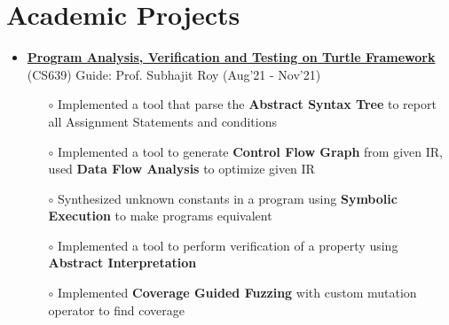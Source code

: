 \documentclass[10.8pt, a4paper]{extarticle}
\newcommand{\shorterSection}[1]{\vspace{-10pt}\section{#1}}
\begin{document}
\shorterSection{Academic Projects}
\vspace{-2pt}
\begin{itemize}




 \item \href{https://github.com/jeetsarangi/Automated-Program-Analysis-Verification-and-Testing} {\textbf{Program Analysis, Verification and Testing on Turtle Framework}} (CS639) Guide: Prof.  Subhajit Roy  \hfill(Aug'21 - Nov'21)
	\\[-0.6cm]
	\begin{itemize}
	    \item[$\circ$] Implemented a tool that parse the \textbf{Abstract Syntax Tree} to report all Assignment Statements and conditions\\[-0.6cm]
	    
	    \item[$\circ$] Implemented a tool to generate \textbf{Control Flow Graph} from given IR, used \textbf{Data Flow Analysis} to optimize given IR\\[-0.6cm]
	    
	    
	    \item[$\circ$] Synthesized unknown constants in a program using \textbf{Symbolic Execution} to make programs equivalent \\[-0.6cm]
	    
	    \item[$\circ$] Implemented a tool to perform verification of a property using \textbf{Abstract Interpretation}\\[-0.6cm]
	    
	    \item[$\circ$] Implemented \textbf{Coverage Guided Fuzzing} with custom mutation operator to find coverage
	\end{itemize}




\end{itemize}
\end{document}
